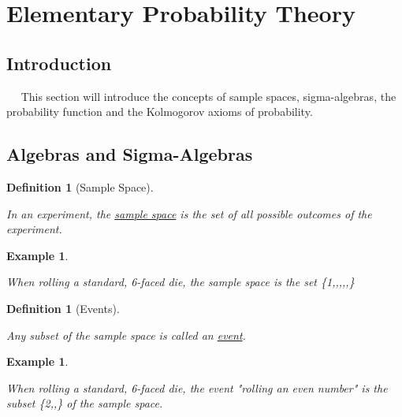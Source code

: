 \documentclass[12pt,a4paper]{article}
\newtheorem{defn}[thm]{Definition}
\newtheorem{ex}[thm]{Example}
\begin{document}
\clearpage
\section{Elementary Probability Theory}

\subsection{Introduction}

$\quad$ This section will introduce the concepts of sample spaces, sigma-algebras, the probability function and the Kolmogorov axioms of probability.
\vspace{12pt}


\subsection{Algebras and Sigma-Algebras}

\begin{defn}[Sample Space]$\;$\par
\vspace{12pt}

In an experiment, the \underline{sample space} is the set of all possible outcomes of the experiment.\end{defn}

\begin{ex}$\;$\par
\vspace{12pt}

When rolling a standard, 6-faced die, the sample space is the set \{1,,,,,\}\end{ex}

\begin{defn}[Events]$\;$\par
\vspace{12pt}

Any subset of the sample space is called an \underline{event}.\end{defn}

\begin{ex}$\;$\par
\vspace{12pt}

When rolling a standard, 6-faced die, the event "rolling an even number" is the subset \{2,,\} of the sample space.\end{ex}
\end{document}
